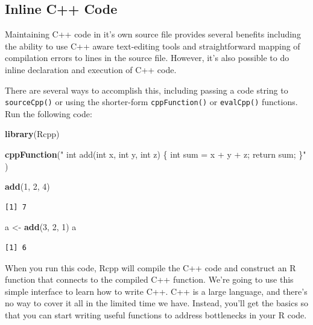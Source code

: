 \documentclass[
]{krantz}
\makeatletter
\newenvironment{Shaded}{\begin{snugshade}}{\end{snugshade}}
\newcommand{\DecValTok}[1]{\textcolor[rgb]{0.06,0.06,0.06}{#1}}
\newcommand{\KeywordTok}[1]{\textcolor[rgb]{0.27,0.27,0.27}{\textbf{#1}}}
\newcommand{\NormalTok}[1]{#1}
\newcommand{\StringTok}[1]{\textcolor[rgb]{0.5,0.5,0.5}{#1}}
\newenvironment{kframe}{%
\medskip{}
\setlength{\fboxsep}{.8em}
 \def\at@end@of@kframe{}%
 \ifinner\ifhmode%
  \def\at@end@of@kframe{\end{minipage}}%
  \begin{minipage}{\columnwidth}%
 \fi\fi%
 \def\FrameCommand##1{\hskip\@totalleftmargin \hskip-\fboxsep
 \colorbox{shadecolor}{##1}\hskip-\fboxsep
     \hskip-\linewidth \hskip-\@totalleftmargin \hskip\columnwidth}%
 \MakeFramed {\advance\hsize-\width
   \@totalleftmargin\z@ \linewidth\hsize
   \@setminipage}}%
 {\par\unskip\endMakeFramed%
 \at@end@of@kframe}
\renewenvironment{Shaded}{\begin{kframe}}{\end{kframe}}
\makeatother
\begin{document}
\hypertarget{inline-c-code}{%
\subsection{Inline C++ Code}\label{inline-c-code}}

Maintaining C++ code in it's own source file provides several benefits including the ability to use C++ aware text-editing tools and straightforward mapping of compilation errors to lines in the source file. However, it's also possible to do inline declaration and execution of C++ code.

There are several ways to accomplish this, including passing a code string to \texttt{sourceCpp()} or using the shorter-form \texttt{cppFunction()} or \texttt{evalCpp()} functions. Run the following code:

\begin{Shaded}
\begin{Highlighting}[]
\KeywordTok{library}\NormalTok{(Rcpp)}

\KeywordTok{cppFunction}\NormalTok{(}\StringTok{"}
\StringTok{  int add(int x, int y, int z) \{}
\StringTok{    int sum = x + y + z;}
\StringTok{    return sum;}
\StringTok{  \}"}
\NormalTok{)}

\KeywordTok{add}\NormalTok{(}\DecValTok{1}\NormalTok{, }\DecValTok{2}\NormalTok{, }\DecValTok{4}\NormalTok{)}
\end{Highlighting}
\end{Shaded}

\begin{verbatim}
[1] 7
\end{verbatim}

\begin{Shaded}
\begin{Highlighting}[]
\NormalTok{a \textless{}{-}}\StringTok{ }\KeywordTok{add}\NormalTok{(}\DecValTok{3}\NormalTok{, }\DecValTok{2}\NormalTok{, }\DecValTok{1}\NormalTok{)}
\NormalTok{a}
\end{Highlighting}
\end{Shaded}

\begin{verbatim}
[1] 6
\end{verbatim}

When you run this code, Rcpp will compile the C++ code and construct an R function that connects to the compiled C++ function. We're going to use this simple interface to learn how to write C++. C++ is a large language, and there's no way to cover it all in the limited time we have. Instead, you'll get the basics so that you can start writing useful functions to address bottlenecks in your R code.
\end{document}
